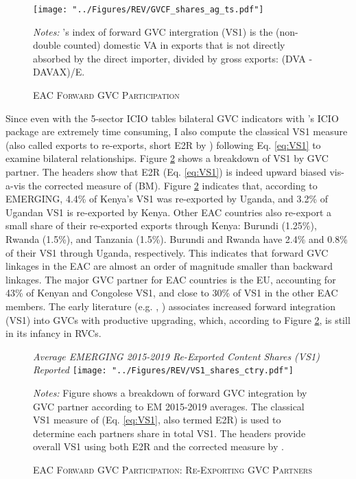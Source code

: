 \documentclass[a4paper]{article}
\begin{document}
\begin{figure}[h!] \vspace{-1mm}
\centering
\caption{\label{fig:EAC_E2R_ag_ts}\textsc{EAC Forward GVC Participation}}
\texttt{[image: "../Figures/REV/GVCF\_shares\_ag\_ts.pdf"]} \\ %
\raggedright
\scriptsize
\emph{Notes:} \citet{borin2019measuring}'s index of forward GVC intergration (VS1) is the (non-double counted) domestic VA in exports that is not directly absorbed by the direct importer, divided by gross exports: (DVA - DAVAX)/E. 
\end{figure}
\FloatBarrier

Since even with the 5-sector ICIO tables bilateral GVC indicators with \citet{belotti2020icio}'s ICIO package are extremely time consuming, I also compute the classical VS1 measure (also called exports to re-exports, short E2R by \citet{baldwin2015supply}) following Eq. \ref{eq:VS1} to examine bilateral relationships. Figure \ref{fig:EACVS1_ctry} shows a breakdown of VS1 by GVC partner. The headers show that E2R (Eq. \ref{eq:VS1}) is indeed upward biased vis-a-vis the corrected measure of \citet{borin2019measuring} (BM). Figure \ref{fig:EACVS1_ctry} indicates that, according to EMERGING, 4.4\% of Kenya's VS1 was re-exported by Uganda, and 3.2\% of Ugandan VS1 is re-exported by Kenya. Other EAC countries also re-export a small share of their re-exported exports through Kenya: Burundi (1.25\%), Rwanda (1.5\%), and Tanzania (1.5\%). Burundi and Rwanda have 2.4\% and 0.8\% of their VS1 through Uganda, respectively. This indicates that forward GVC linkages in the EAC are almost an order of magnitude smaller than backward linkages. The major GVC partner for EAC countries is the EU, accounting for 43\% of Kenyan and Congolese VS1, and close to 30\% of VS1 in the other EAC members. The early literature (e.g. \citet{foster2015global}, \citet{Kummritz20161}) %
associates increased forward integration (VS1) into GVCs with productive upgrading, which, according to Figure \ref{fig:EACVS1_ctry}, is still in its infancy in RVCs.

\begin{figure}[h!]
\centering
\caption{\label{fig:EACVS1_ctry}\textsc{EAC Forward GVC Participation: Re-Exporting GVC Partners}}
\small{\textit{Average EMERGING 2015-2019 Re-Exported Content Shares (VS1) Reported}}
\vspace{2mm}
\texttt{[image: "../Figures/REV/VS1\_shares\_ctry.pdf"]} \\ %
\raggedright
\scriptsize
\vspace{-3mm}
\emph{Notes:} Figure shows a breakdown of forward GVC integration by GVC partner according to EM 2015-2019 averages. The classical VS1 measure of \citet{daudin2011produces} (Eq. \ref{eq:VS1}, also termed E2R) is used to determine each partners share in total VS1. The headers provide overall VS1 using both E2R and the corrected measure by \citet{borin2019measuring}. 
\end{figure}
\FloatBarrier
\end{document}
